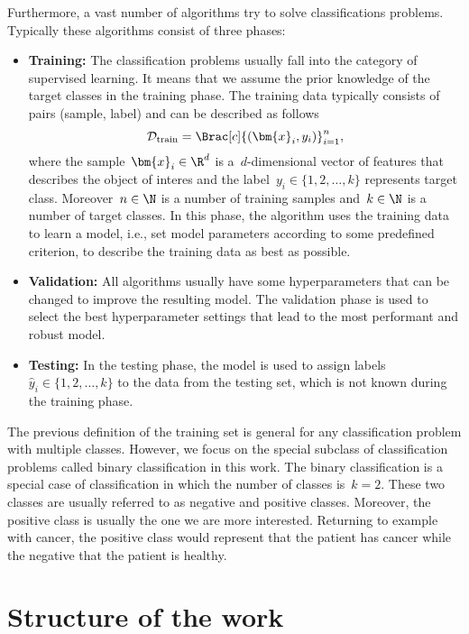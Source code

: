 Furthermore, a vast number of algorithms try to solve classifications problems. Typically these algorithms consist of three phases:
\begin{itemize}
  \item \textbf{Training:} The classification problems usually fall into the category of supervised learning. It means that we assume the prior knowledge of the target classes in the training phase. The training data typically consists of pairs (sample, label) and can be described as follows
  \begin{equation*}\label{eq: training set}
    \mathcal{D}_{\mathrm{train}} = \Brac[c]{(\bm{x}_i, y_i)}_{i=1}^{n},
  \end{equation*}
  where the sample~$\bm{x}_i \in \R^d$ is a~$d$-dimensional vector of features that describes the object of interes and the label~$y_i \in \{1, 2, \ldots, k\}$ represents target class. Moreover~$n \in \N$ is a number of training samples and~$k \in \N$ is a number of target classes. In this phase, the algorithm uses the training data to learn a model, i.e., set model parameters according to some predefined criterion, to describe the training data as best as possible.
  \item \textbf{Validation:} All algorithms usually have some hyperparameters that can be changed to improve the resulting model. The validation phase is used to select the best hyperparameter settings that lead to the most performant and robust model.
  \item \textbf{Testing:} In the testing phase, the model is used to assign labels~$\hat{y}_i \in \{1, 2, \ldots, k\}$ to the data from the testing set, which is not known during the training phase.
\end{itemize}
The previous definition of the training set is general for any classification problem with multiple classes. However, we focus on the special subclass of classification problems called binary classification in this work. The binary classification is a special case of classification in which the number of classes is~$k=2.$ These two classes are usually referred to as negative and positive classes. Moreover, the positive class is usually the one we are more interested. Returning to example with cancer, the positive class would represent that the patient has cancer while the negative that the patient is healthy.


\section*{Structure of the work}

